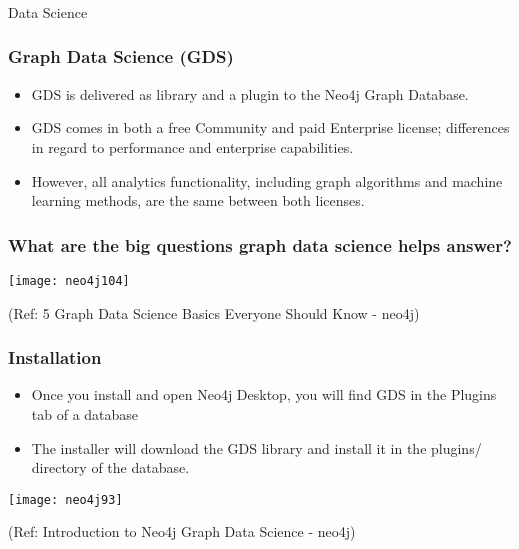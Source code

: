 \begin{frame}[fragile]\frametitle{}
\begin{center}
{\Large Data Science}
\end{center}
\end{frame}

\begin{frame}[fragile]\frametitle{Graph Data Science (GDS)}
\begin{itemize}
\item GDS is delivered as library and a plugin to the Neo4j Graph Database. 
\item GDS comes in both a free Community and paid Enterprise license; differences in regard to performance and enterprise capabilities. 
\item However, all analytics functionality, including graph algorithms and machine learning methods, are the same between both licenses.
\end{itemize}

\end{frame}

\begin{frame}\frametitle{  What are the big questions  graph data science helps answer?  }

\begin{center}
\texttt{[image: neo4j104]}
\end{center}	  


{\tiny (Ref: 5 Graph Data Science Basics Everyone Should Know - neo4j)}
\end{frame}


\begin{frame}[fragile]\frametitle{Installation}

\begin{itemize}
\item Once you install and open Neo4j Desktop, you will find GDS in the Plugins tab of a database
\item The installer will download the GDS library and install it in the plugins/ directory of the database. 
\end{itemize}

\begin{center}
\texttt{[image: neo4j93]}
\end{center}	

{\tiny (Ref: Introduction to Neo4j Graph Data Science - neo4j)}
\end{frame}

